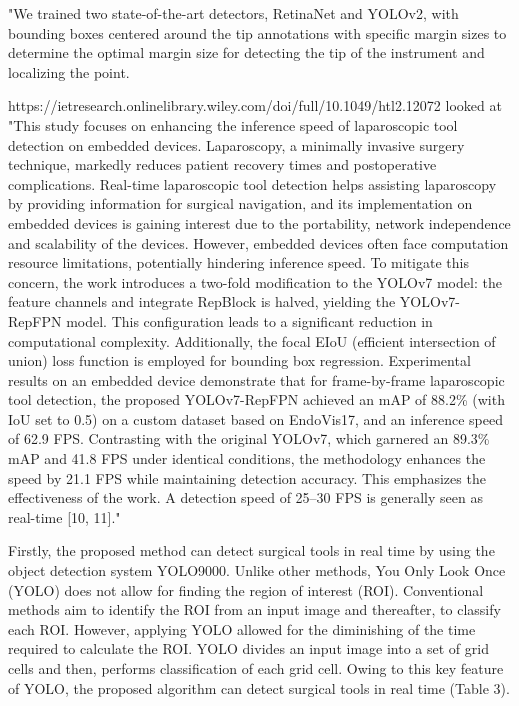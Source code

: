"We trained two state-of-the-art detectors, RetinaNet and YOLOv2, with bounding boxes centered around the tip annotations with specific margin sizes to determine the optimal margin size for detecting the tip of the instrument and localizing the point. 

https://ietresearch.onlinelibrary.wiley.com/doi/full/10.1049/htl2.12072 looked at "This study focuses on enhancing the inference speed of laparoscopic tool detection on embedded devices. Laparoscopy, a minimally invasive surgery technique, markedly reduces patient recovery times and postoperative complications. Real-time laparoscopic tool detection helps assisting laparoscopy by providing information for surgical navigation, and its implementation on embedded devices is gaining interest due to the portability, network independence and scalability of the devices. However, embedded devices often face computation resource limitations, potentially hindering inference speed. To mitigate this concern, the work introduces a two-fold modification to the YOLOv7 model: the feature channels and integrate RepBlock is halved, yielding the YOLOv7-RepFPN model. This configuration leads to a significant reduction in computational complexity. Additionally, the focal EIoU (efficient intersection of union) loss function is employed for bounding box regression. Experimental results on an embedded device demonstrate that for frame-by-frame laparoscopic tool detection, the proposed YOLOv7-RepFPN achieved an mAP of 88.2\% (with IoU set to 0.5) on a custom dataset based on EndoVis17, and an inference speed of 62.9 FPS. Contrasting with the original YOLOv7, which garnered an 89.3\% mAP and 41.8 FPS under identical conditions, the methodology enhances the speed by 21.1 FPS while maintaining detection accuracy. This emphasizes the effectiveness of the work. A detection speed of 25–30 FPS is generally seen as real-time [10, 11]."

Firstly, the proposed method can detect surgical tools in real time by using the object detection system YOLO9000. Unlike other methods, You Only Look Once (YOLO) does not allow for finding the region of interest (ROI). Conventional methods aim to identify the ROI from an input image and thereafter, to classify each ROI. However, applying YOLO allowed for the diminishing of the time required to calculate the ROI. YOLO divides an input image into a set of grid cells and then, performs classification of each grid cell. Owing to this key feature of YOLO, the proposed algorithm can detect surgical tools in real time (Table 3).

